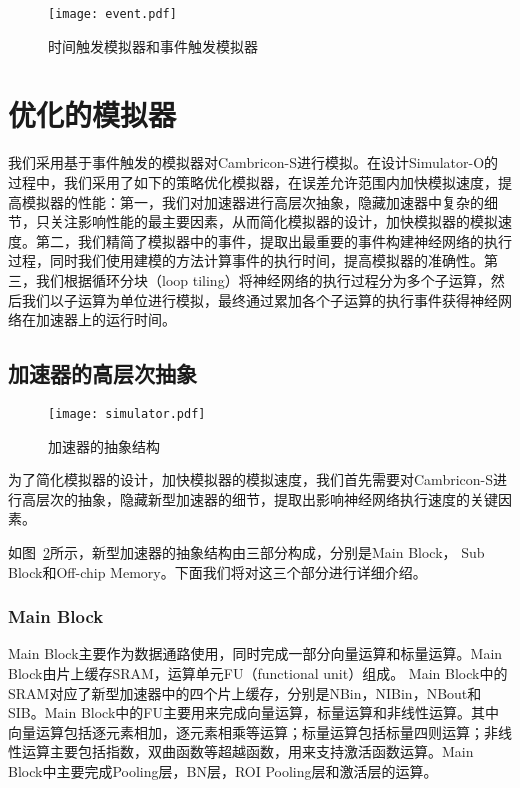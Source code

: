 \begin{figure}[h]
\centering
\texttt{[image: event.pdf]}
\caption{时间触发模拟器和事件触发模拟器}
\label{fig:event}
\end{figure}

\section{优化的模拟器}

我们采用基于事件触发的模拟器对Cambricon-S进行模拟。在设计Simulator-O的过程中，我们采用了如下的策略优化模拟器，在误差允许范围内加快模拟速度，提高模拟器的性能：第一，我们对加速器进行高层次抽象，隐藏加速器中复杂的细节，只关注影响性能的最主要因素，从而简化模拟器的设计，加快模拟器的模拟速度。第二，我们精简了模拟器中的事件，提取出最重要的事件构建神经网络的执行过程，同时我们使用建模的方法计算事件的执行时间，提高模拟器的准确性。第三，我们根据循环分块（loop tiling）将神经网络的执行过程分为多个子运算，然后我们以子运算为单位进行模拟，最终通过累加各个子运算的执行事件获得神经网络在加速器上的运行时间。


\subsection{加速器的高层次抽象}

\begin{figure}[h]
\centering
\texttt{[image: simulator.pdf]}
\caption{加速器的抽象结构}
\label{fig:simulator}
\end{figure}

为了简化模拟器的设计，加快模拟器的模拟速度，我们首先需要对Cambricon-S进行高层次的抽象，隐藏新型加速器的细节，提取出影响神经网络执行速度的关键因素。

如图~\ref{fig:simulator}所示，新型加速器的抽象结构由三部分构成，分别是Main Block， Sub Block和Off-chip Memory。下面我们将对这三个部分进行详细介绍。

\subsubsection{Main Block}
Main Block主要作为数据通路使用，同时完成一部分向量运算和标量运算。Main Block由片上缓存SRAM，运算单元FU（functional unit）组成。
Main Block中的SRAM对应了新型加速器中的四个片上缓存，分别是NBin，NIBin，NBout和SIB。Main Block中的FU主要用来完成向量运算，标量运算和非线性运算。其中向量运算包括逐元素相加，逐元素相乘等运算；标量运算包括标量四则运算；非线性运算主要包括指数，双曲函数等超越函数，用来支持激活函数运算。Main Block中主要完成Pooling层，BN层，ROI Pooling层和激活层的运算。

